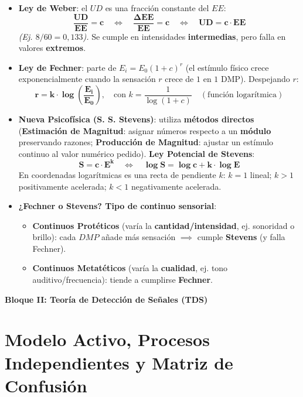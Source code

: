 \documentclass[11pt,a4paper]{article}
\newcommand{\bloque}[1]{%
  \vspace{0.6em}
  \begin{tcolorbox}[colback=Primary,colframe=Primary,arc=3pt,left=12pt,right=12pt,top=8pt,bottom=8pt,boxrule=0pt,after skip=8pt]
    {\Large\bfseries\color{white} #1}
  \end{tcolorbox}
}
\begin{document}
\begin{cajaFormula}[title={Leyes Cuantitativas y Validez según el Tipo de Continuo}]
\begin{itemize}
  \item \textbf{Ley de Weber}: el $UD$ es una fracción constante del $EE$:
  \[
    \mathbf{\frac{UD}{EE} = c \quad\Longleftrightarrow\quad \frac{\Delta EE}{EE} = c \quad\Longleftrightarrow\quad UD = c \cdot EE}
  \]
  \textit{(Ej. $8/60 = 0,133$).} Se cumple en intensidades \textbf{intermedias}, pero falla en valores \textbf{extremos}.
  \item \textbf{Ley de Fechner}: parte de $E_i = E_0 (1+c)^r$ (el estímulo físico crece exponencialmente cuando la sensación $r$ crece de $1$ en $1\text{ DMP}$). Despejando $r$:
  \[
    \mathbf{r = k \cdot \log\left(\frac{E_i}{E_0}\right)}, \quad \text{con } k = \frac{1}{\log(1+c)} \quad (\text{función logarítmica})
  \]
  \item \textbf{Nueva Psicofísica (S. S. Stevens)}: utiliza \textbf{métodos directos} (\textbf{Estimación de Magnitud}: asignar números respecto a un \textbf{módulo} preservando razones; \textbf{Producción de Magnitud}: ajustar un estímulo continuo al valor numérico pedido). \textbf{Ley Potencial de Stevens}:
  \[
    \mathbf{S = c \cdot E^k \quad\Longleftrightarrow\quad \log S = \log c + k \cdot \log E}
  \]
  En coordenadas logarítmicas es una recta de pendiente $k$: \textbf{$k=1$} lineal; \textbf{$k>1$} positivamente acelerada; \textbf{$k<1$} negativamente acelerada.
  \item \textbf{¿Fechner o Stevens? Tipo de continuo sensorial}:
  \begin{itemize}
    \item \textbf{Continuos Protéticos} (varía la \textbf{cantidad/intensidad}, ej. sonoridad o brillo): cada $DMP$ añade más sensación $\implies$ cumple \textbf{Stevens} (y falla Fechner).
    \item \textbf{Continuos Metatéticos} (varía la \textbf{cualidad}, ej. tono auditivo/frecuencia): tiende a cumplirse \textbf{Fechner}.
  \end{itemize}
\end{itemize}
\end{cajaFormula}

\newpage
\bloque{Bloque II: Teoría de Detección de Señales (TDS)}
\setcounter{section}{0}

\section{Modelo Activo, Procesos Independientes y Matriz de Confusión}
\end{document}
